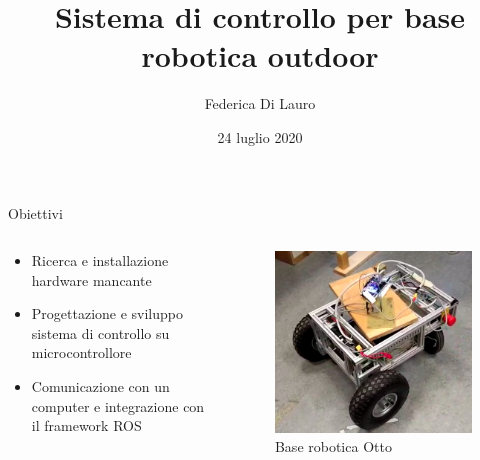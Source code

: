 \documentclass{beamer}
\author{Federica Di Lauro}
\title{Sistema di controllo per base robotica outdoor}
\date{24 luglio 2020}
\begin{document}
\titlepageframe %

\begin{tframe}{Obiettivi}

\begin{columns}
    \begin{column}{0.5\textwidth}
    \vspace{-10mm}
        \begin{itemize}
            \item Ricerca e installazione hardware mancante
            \item Progettazione e sviluppo sistema di controllo su microcontrollore
            \item Comunicazione con un computer e integrazione con il framework ROS
        \end{itemize}
    \end{column}

    \begin{column}{0.48\textwidth}
        \begin{center}

            \begin{figure}
                \centering
                \includegraphics[width=0.9\columnwidth]{img/otto2.png}
                \caption*{Base robotica Otto}
            \end{figure}

        \end{center}
    \end{column}
\end{columns}
\end{tframe}
\end{document}
